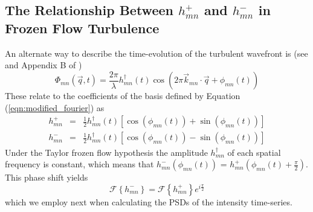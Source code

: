 \documentclass[10pt,preprint]{aastex631}
\begin{document}
% 
% 
% 

\subsection{The Relationship Between $h_{mn}^+$ and $h_{mn}^-$ in Frozen Flow Turbulence}

An alternate way to describe the time-evolution of the turbulent wavefront is (see \citet{2005ApJ...629..592G} and Appendix B of \citet{2018JATIS...4a9001M})
\begin{equation}
\Phi_{mn}(\vec{q},t) = \frac{2\pi}{\lambda} h_{mn}^\dagger(t) \cos \left( 2\pi \vec{k}_{mn} \cdot \vec{q} + \phi_{mn}(t) \right)
\end{equation}
These relate to the coefficients of the basis defined by Equation (\ref{eqn:modified_fourier}) as
\begin{eqnarray}
h_{mn}^+ &=& \frac{1}{2} h_{mn}^\dagger(t) \left[ \cos(\phi_{mn}(t)) + \sin(\phi_{mn}(t))\right] \\
h_{mn}^- &=& \frac{1}{2} h_{mn}^\dagger(t) \left[ \cos(\phi_{mn}(t)) - \sin(\phi_{mn}(t))\right] \nonumber
\end{eqnarray}
Under the Taylor frozen flow hypothesis the amplitude $h_{mn}^\dagger$ of each spatial frequency is constant, which means that $h_{mn}^-(\phi_{mn}(t))$ = $h_{mn}^+(\phi_{mn}(t) + \frac{\pi}{2})$.  This phase shift yields
\begin{equation}
\mathcal{F}\left\{h_{mn}^-\right\} = \mathcal{F}\left\{h_{mn}^+\right\} e^{i\frac{\pi}{2}}
\end{equation}
which we employ next when calculating the PSDs of the intensity time-series.
\end{document}
